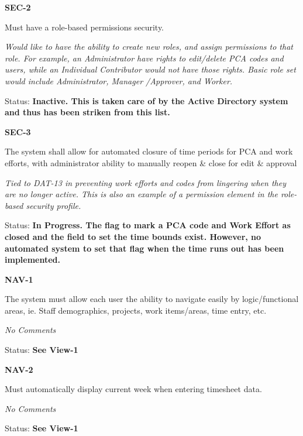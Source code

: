 \noindent \textit{}

\noindent \textbf{SEC-2}

\noindent Must have a role-based permissions security.

\noindent \textit{Would like to have the ability to create new roles, and assign permissions to that role. For example, an Administrator have rights to edit/delete PCA codes and users, while an Individual Contributor would not have those rights. Basic role set would include Administrator, Manager /Approver, and Worker.}

\noindent Status: \textbf{Inactive.  This is taken care of by the Active Directory system and thus has been striken from this list.}\\

\noindent 

\noindent \textbf{SEC-3}

\noindent The system shall allow for automated closure of time periods for PCA and work efforts, with administrator ability to manually reopen \& close for edit \& approval

\noindent \textit{Tied to DAT-13 in preventing work efforts and codes from lingering when they are no longer active. This is also an example of a permission element in the role-based security profile.}

\noindent Status: \textbf{In Progress.  The flag to mark a PCA code and Work Effort as closed and the field to set the time bounds exist.  However, no automated system to set that flag when the time runs out has been implemented.}\\

\noindent 

\noindent \textbf{NAV-1}

\noindent The system must allow each user the ability to navigate easily by logic/functional areas, ie. Staff demographics, projects, work items/areas, time entry, etc.

 \textit{No Comments}

Status: \textbf{See View-1}\textit{}\\

\noindent 

\noindent \textbf{NAV-2}

\noindent Must automatically display current week when entering timesheet data.

 \textit{No Comments }

\textit{ }Status: \textbf{See View-1}\textit{}\\

